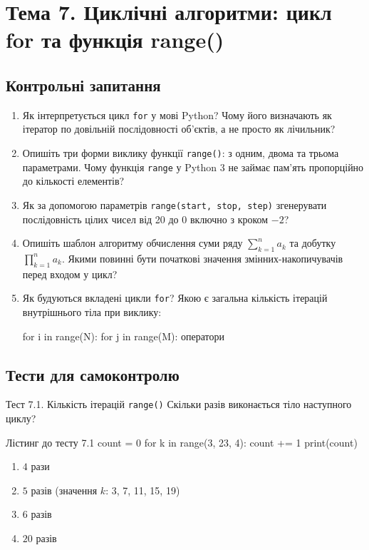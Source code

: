 \section{Тема 7. Циклічні алгоритми: цикл for та функція range()}

\subsection*{Контрольні запитання}
\begin{enumerate}[label=\textbf{7.\arabic*.}]
	\item Як інтерпретується цикл \texttt{for} у мові Python? Чому його визначають як ітератор по довільній послідовності об'єктів, а не просто як лічильник?
	\item Опишіть три форми виклику функції \texttt{range()}: з одним, двома та трьома параметрами. Чому функція \texttt{range} у Python 3 не займає пам'ять пропорційно до кількості елементів?
	\item Як за допомогою параметрів \texttt{range(start, stop, step)} згенерувати послідовність цілих чисел від 20 до 0 включно з кроком $-2$?
	\item Опишіть шаблон алгоритму обчислення суми ряду $\sum_{k=1}^n a_k$ та добутку $\prod_{k=1}^n a_k$. Якими повинні бути початкові значення змінних-накопичувачів перед входом у цикл?
	\item Як будуються вкладені цикли \texttt{for}? Якою є загальна кількість ітерацій внутрішнього тіла при виклику:
	\begin{pydef}
for i in range(N):
    for j in range(M):
        оператори\end{pydef}
\end{enumerate}

\subsection*{Тести для самоконтролю}

\begin{pr}{Тест 7.1. Кількість ітерацій \texttt{range()}}
Скільки разів виконається тіло наступного циклу?
\begin{py}{Лістинг до тесту 7.1}
count = 0
for k in range(3, 23, 4):
    count += 1
print(count)
\end{py}
\begin{enumerate}[label=\textbf{\Alph*.}]
	\item $4$ рази
	\item $5$ разів (значення $k$: 3, 7, 11, 15, 19)
	\item $6$ разів
	\item $20$ разів
\end{enumerate}
\end{pr}

